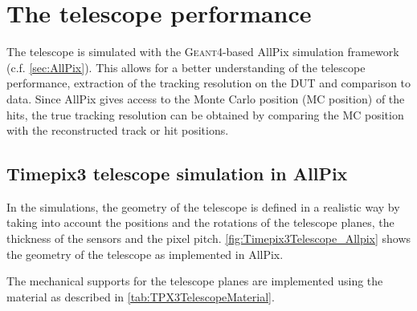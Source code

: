 \section{The telescope performance}
\label{sec:telescopePerformance}

The telescope is simulated with the \textsc{Geant4}-based AllPix
simulation framework (c.f. \cref{sec:AllPix}). This allows for a
better understanding of the telescope performance, extraction of the
tracking resolution on the DUT and comparison to data. Since AllPix
gives access to the Monte Carlo position (MC position) of the hits,
the true tracking resolution can be obtained by comparing the MC
position with the reconstructed track or hit positions.

\subsection{Timepix3 telescope simulation in AllPix}
In the simulations, the geometry of the telescope is defined in a
realistic way by taking into account the positions and the rotations
of the telescope planes, the thickness of the sensors and the pixel
pitch. \cref{fig:Timepix3Telescope_Allpix} shows the geometry of the
telescope as implemented in AllPix.

The mechanical supports for the telescope planes are implemented using
the material as described in \cref{tab:TPX3TelescopeMaterial}.


